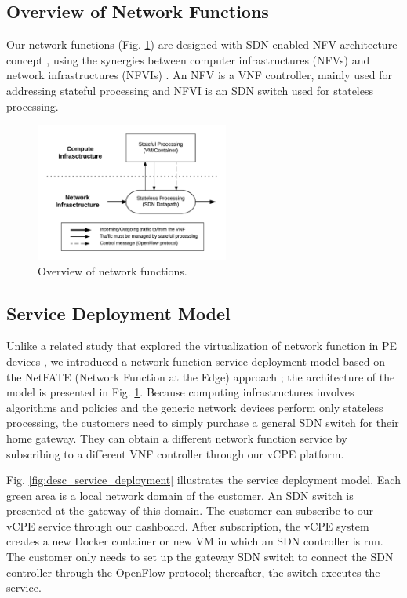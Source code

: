 \documentclass[conference]{IEEEtran}
\begin{document}
\subsection{Overview of Network Functions} \label{ssec:desc_nfv_overview}
Our network functions (Fig. \ref{fig:desc_nfv_overview}) are designed with SDN-enabled NFV architecture concept \cite{sdn-enabled}, using the synergies between computer infrastructures (NFVs) and network infrastructures (NFVIs) \cite{nfv2014-v121, nfv2015}.
An NFV is a VNF controller, mainly used for addressing stateful processing and NFVI is an SDN switch used for stateless processing.

\begin{figure}[!t]
\centering
\includegraphics[width=2.5in]{./figures/desc_nfv_overview}
\caption{Overview of network functions.}
\label{fig:desc_nfv_overview}
\end{figure}

\subsection{Service Deployment Model}
Unlike a related study that explored the virtualization of network function in PE devices \cite{vcpe-enhance}, we introduced a network function service deployment model based on the NetFATE (Network Function at the Edge) approach \cite{netfate}; the architecture of the model is presented in Fig. \ref{fig:desc_nfv_overview}. Because computing infrastructures involves algorithms and policies and the generic network devices perform only stateless processing, the customers need to simply purchase a general SDN switch for their home gateway. They can obtain a different network function service by subscribing to a different VNF controller through our vCPE platform.

Fig. \ref{fig:desc_service_deployment} illustrates the service deployment model. Each green area is a local network domain of the customer. An SDN switch is presented at the gateway of this domain. The customer can subscribe to our vCPE service through our dashboard. After subscription, the vCPE system creates a new Docker container or new VM in which an SDN controller is run. The customer only needs to set up the gateway SDN switch to connect the SDN controller through the OpenFlow protocol; thereafter, the switch executes the service.
\end{document}
